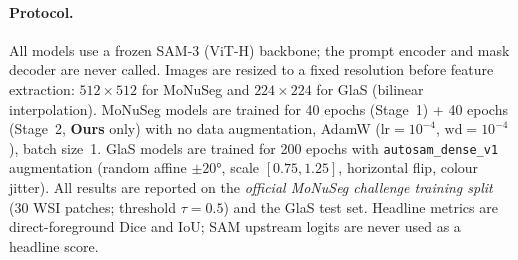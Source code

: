 
\paragraph{Protocol.}
All models use a frozen SAM-3 (ViT-H) backbone; the prompt encoder and mask decoder are never
called. Images are resized to a fixed resolution before feature extraction:
$512{\times}512$ for MoNuSeg and $224{\times}224$ for GlaS (bilinear interpolation).
MoNuSeg models are trained for 40 epochs (Stage~1) + 40 epochs (Stage~2, \textbf{Ours} only)
with no data augmentation, AdamW ($\text{lr}=10^{-4}$, $\text{wd}=10^{-4}$), batch size~1.
GlaS models are trained for 200 epochs with \texttt{autosam\_dense\_v1} augmentation
(random affine $\pm 20°$, scale $[0.75,1.25]$, horizontal flip, colour jitter).
All results are reported on the \emph{official MoNuSeg challenge training split}
(30 WSI patches; threshold $\tau{=}0.5$) and the GlaS test set.
Headline metrics are direct-foreground Dice and IoU; SAM upstream logits are never used as a
headline score.
